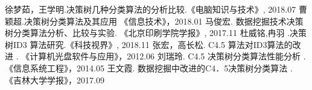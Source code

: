 \documentclass[11pt,a4paper]{article}
\begin{document}
\begin{thebibliography}{00}
   徐梦茹，王学明.决策树几种分类算法的分析比较.《电脑知识与技术》, 2018.07
   曹颖超.决策树分类算法及其应用 《信息技术》，2018.01
   马俊宏. 数据挖掘技术决策树分类算法分析、比较与实验. 《北京印刷学院学报》, 2017.11
   杜威铭,冉羽 .决策树ID3 算法研究.《科技视界》, 2018.11
   张宏，高长松. C4.5 算法对ID3算法的改进 . 《计算机光盘软件与应用》，2012.06
    刘瑞玲. C4.5 决策树分类算法性能分析 . 《信息系统工程》，2014.05
    王文霞. 数据挖掘中改进的C4．5决策树分类算法 . 《吉林大学学报》，2017.09
\end{thebibliography}
\end{document}
